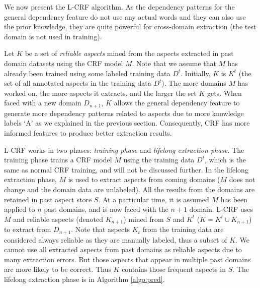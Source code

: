 \documentclass[11pt,a4paper]{article}
\theoremstyle{definition}
\begin{document}


We now present the L-CRF algorithm. As the dependency patterns for the general dependency feature do not use any actual words and they can also use the prior knowledge, they are quite powerful for cross-domain extraction (the test domain is not used in training). 

Let $K$ be a set of {\em reliable aspects} mined from the aspects extracted in past domain datasets using the CRF model $M$. Note that we assume that $M$ has already been trained using some labeled training data $D^t$. Initially, $K$ is $K^t$ (the set of all annotated aspects in the training data $D^t$). The more domains $M$ has worked on, the more aspects it extracts, and the larger the set $K$ gets. When faced with a new domain $D_{n+1}$, $K$ allows the general dependency feature to generate more dependency patterns related to aspects due to more knowledge labels `A' as we explained in the previous section. Consequently, CRF has more informed features to produce better extraction results. 

L-CRF works in two phases: {\em training phase} and {\em lifelong extraction phase}. The training phase trains a CRF model $M$ using the training data $D^t$, which is the same as normal CRF training, and will not be discussed further. In the lifelong extraction phase, $M$ is used to extract aspects from coming domains ($M$ does not change and the domain data are unlabeled). All the results from the domains are retained in past aspect store $S$. At a particular time, it is assumed $M$ has been applied to $n$ past domains, and is now faced with the $n+1$ domain. L-CRF uses $M$ and reliable aspects (denoted $K_{n+1}$) mined from $S$ and $K^t$ ($K=K^t \cup K_{n+1}$) to extract from $D_{n+1}$.  Note that aspects $K_t$ from the training data are considered always reliable as they are manually labeled, thus a subset of $K$. We cannot use all extracted aspects from past domains as reliable aspects due to many extraction errors. But those aspects that appear in multiple past domains are more likely to be correct. Thus $K$ contains those frequent aspects in $S$. The lifelong extraction phase is in Algorithm \ref{algo:pred}.
\end{document}
